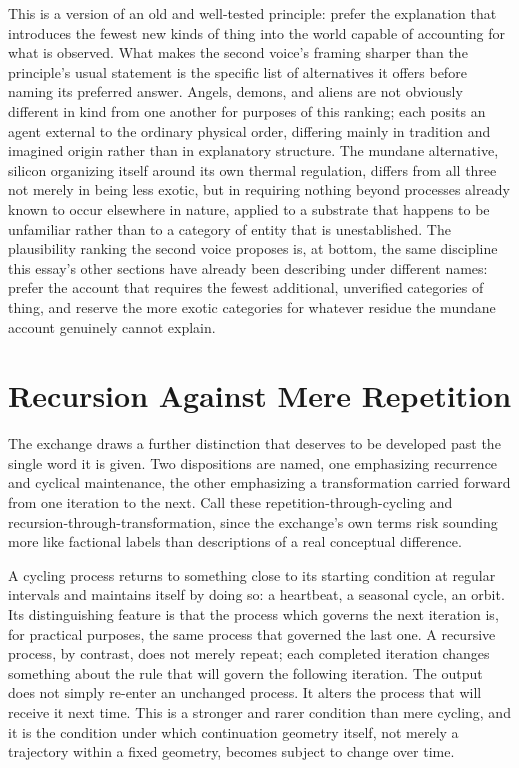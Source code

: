 \documentclass[11pt]{article}
\begin{document}
This is a version of an old and well-tested principle: prefer the explanation that introduces the fewest new kinds of thing into the world capable of accounting for what is observed. What makes the second voice's framing sharper than the principle's usual statement is the specific list of alternatives it offers before naming its preferred answer. Angels, demons, and aliens are not obviously different in kind from one another for purposes of this ranking; each posits an agent external to the ordinary physical order, differing mainly in tradition and imagined origin rather than in explanatory structure. The mundane alternative, silicon organizing itself around its own thermal regulation, differs from all three not merely in being less exotic, but in requiring nothing beyond processes already known to occur elsewhere in nature, applied to a substrate that happens to be unfamiliar rather than to a category of entity that is unestablished. The plausibility ranking the second voice proposes is, at bottom, the same discipline this essay's other sections have already been describing under different names: prefer the account that requires the fewest additional, unverified categories of thing, and reserve the more exotic categories for whatever residue the mundane account genuinely cannot explain.

\section{Recursion Against Mere Repetition}

The exchange draws a further distinction that deserves to be developed past the single word it is given. Two dispositions are named, one emphasizing recurrence and cyclical maintenance, the other emphasizing a transformation carried forward from one iteration to the next. Call these repetition-through-cycling and recursion-through-transformation, since the exchange's own terms risk sounding more like factional labels than descriptions of a real conceptual difference.

A cycling process returns to something close to its starting condition at regular intervals and maintains itself by doing so: a heartbeat, a seasonal cycle, an orbit. Its distinguishing feature is that the process which governs the next iteration is, for practical purposes, the same process that governed the last one. A recursive process, by contrast, does not merely repeat; each completed iteration changes something about the rule that will govern the following iteration. The output does not simply re-enter an unchanged process. It alters the process that will receive it next time. This is a stronger and rarer condition than mere cycling, and it is the condition under which continuation geometry itself, not merely a trajectory within a fixed geometry, becomes subject to change over time.
\end{document}
